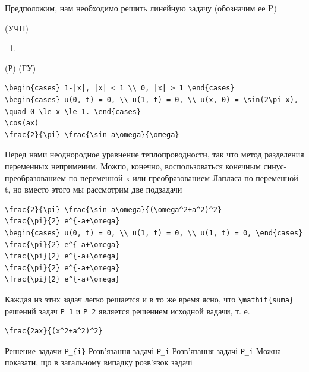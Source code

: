 \documentclass[
  ukrainian,
]{article}
\providecommand{\tightlist}{%
  \setlength{\itemsep}{0pt}\setlength{\parskip}{0pt}}
\begin{document}
Предположим, нам необходимо решить линейную задачу (обозначим ее P)

(УЧП)

\begin{enumerate}
\def\labelenumi{\arabic{enumi}.}
\setcounter{enumi}{17}
\tightlist
\item
\end{enumerate}

(Р) (ГУ)

\begin{verbatim}
\begin{cases} 1-|x|, |x| < 1 \\ 0, |x| > 1 \end{cases}
\begin{cases} u(0, t) = 0, \\ u(1, t) = 0, \\ u(x, 0) = \sin(2\pi x), \quad 0 \le x \le 1. \end{cases}
\cos(ax)
\frac{2}{\pi} \frac{\sin a\omega}{\omega}
\end{verbatim}

Перед нами неоднородное уравнение теплопроводности, так что метод
разделения переменных неприменим. Можпо, конечно, воспользоваться
конечным синус-преобразованием по переменной x или преобразованием
Лапласа по переменной t, но вместо этого мы рассмотрим две подзадачи

\begin{verbatim}
\frac{2}{\pi} \frac{\sin a\omega}{(\omega^2+a^2)^2}
\frac{\pi}{2} e^{-a+\omega}
\begin{cases} u(0, t) = 0, \\ u(1, t) = 0, \\ u(1, t) = 0, \end{cases}
\frac{\pi}{2} e^{-a+\omega}
\frac{\pi}{2} e^{-a+\omega}
\frac{\pi}{2} e^{-a+\omega}
\frac{\pi}{2} e^{-a+\omega}
\end{verbatim}

Каждая из этих задач легко решается и в то же время ясно, что
\texttt{\textbackslash{}mathit\{suma\}} решений задач \texttt{P\_1} и
\texttt{P\_2} является решением исходной вадачи, т. е.

\begin{verbatim}
\frac{2ax}{(x^2+a^2)^2}
\end{verbatim}

Решение задачи \texttt{P\_\{i\}} Розв'язання задачі \texttt{P\_i}
Розв'язання задачі \texttt{P\_i} Можна показати, що в загальному випадку
розв'язок задачі
\end{document}
